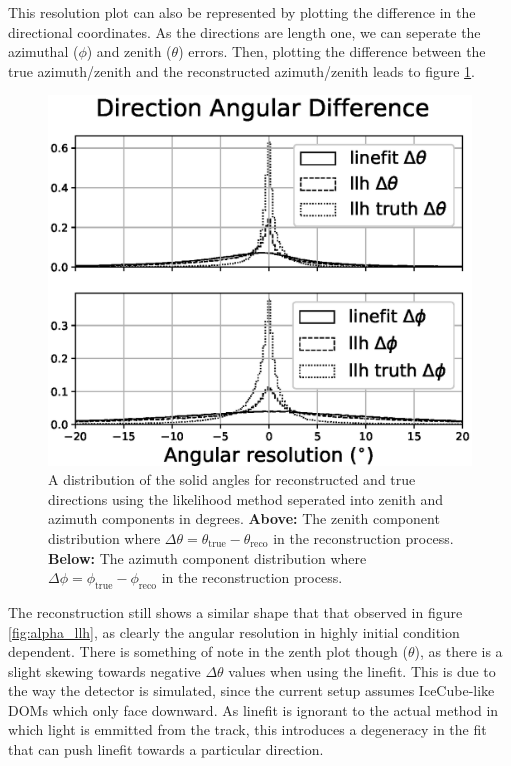 This resolution plot can also be represented by plotting the difference in the directional coordinates. As the directions are length one, we can seperate the azimuthal ($\phi$) and zenith ($\theta$) errors. Then, plotting the difference between the true azimuth/zenith and the reconstructed azimuth/zenith leads to figure \ref{fig:alpha_llh_sep}. 

\begin{figure}[H]
  \centering
  \includegraphics[width=12cm]{./Figures/reco_plots/angular_diff_dir.eps}
  \caption{A distribution of the solid angles for reconstructed and true directions using the likelihood method seperated into zenith and azimuth components in degrees. \textbf{Above:} The zenith component distribution where $\Delta\theta = \theta_{\text{true}} - \theta_{\text{reco}}$ in the reconstruction process. \textbf{Below:} The azimuth component distribution where $\Delta\phi = \phi_{\text{true}} - \phi_{\text{reco}}$ in the reconstruction process.}
  \label{fig:alpha_llh_sep}
\end{figure}

The reconstruction still shows a similar shape that that observed in figure \ref{fig:alpha_llh}, as clearly the angular resolution in highly initial condition dependent. There is something of note in the zenth plot though ($\theta$), as there is a slight skewing towards negative $\Delta\theta$ values when using the linefit. This is due to the way the detector is simulated, since the current setup assumes IceCube-like DOMs which only face downward. As linefit is ignorant to the actual method in which light is emmitted from the track, this introduces a degeneracy in the fit that can push linefit towards a particular direction.

